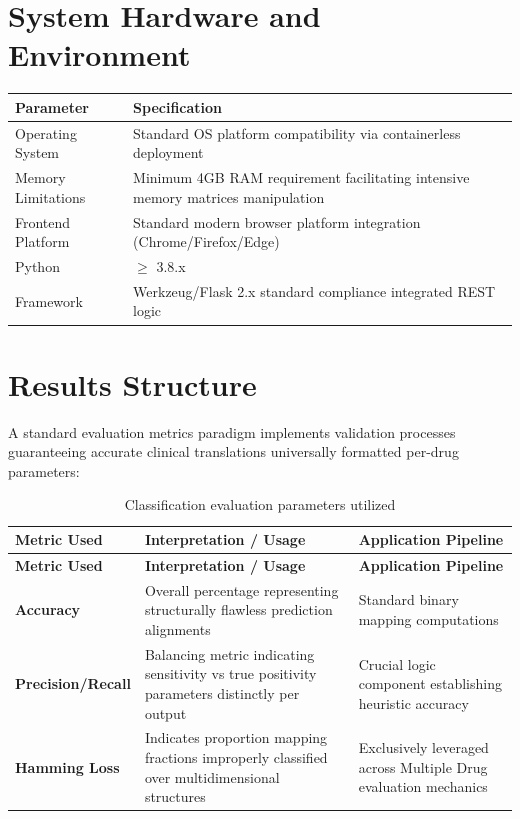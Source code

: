 \documentclass[12pt,a4paper]{report}
\begin{document}
\section{System Hardware and Environment}

\begin{center}
\renewcommand{\arraystretch}{1.3}
\begin{tabular}{@{}ll@{}}
\toprule
\textbf{Parameter} & \textbf{Specification} \\
\midrule
Operating System & Standard OS platform compatibility via containerless deployment \\
Memory Limitations & Minimum 4GB RAM requirement facilitating intensive memory matrices manipulation \\
Frontend Platform & Standard modern browser platform integration (Chrome/Firefox/Edge) \\
Python & $\geq$ 3.8.x \\
Framework & Werkzeug/Flask 2.x standard compliance integrated REST logic \\
\bottomrule
\end{tabular}
\end{center}

\section{Results Structure}

A standard evaluation metrics paradigm implements validation processes guaranteeing accurate clinical translations universally formatted per-drug parameters:

\begin{longtable}{@{}p{4.2cm}p{4.5cm}p{4.3cm}@{}}
\toprule
\textbf{Metric Used} & \textbf{Interpretation / Usage} & \textbf{Application Pipeline} \\
\midrule
\endfirsthead
\toprule
\textbf{Metric Used} & \textbf{Interpretation / Usage} & \textbf{Application Pipeline} \\
\midrule
\endhead
\bottomrule
\caption{Classification evaluation parameters utilized}
\label{tab:results}
\endlastfoot
\bottomrule
\endfoot
\textbf{Accuracy} & Overall percentage representing structurally flawless prediction alignments & Standard binary mapping computations \\
\textbf{Precision/Recall} & Balancing metric indicating sensitivity vs true positivity parameters distinctly per output & Crucial logic component establishing heuristic accuracy \\
\textbf{Hamming Loss} & Indicates proportion mapping fractions improperly classified over multidimensional structures & Exclusively leveraged across Multiple Drug evaluation mechanics \\
\end{longtable}
\end{document}
